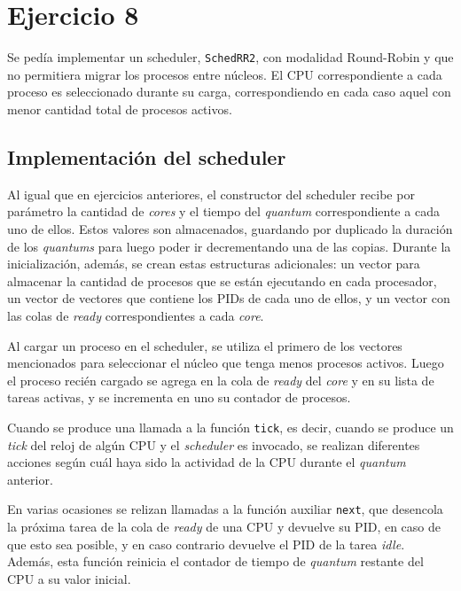 \section{Ejercicio 8}

Se pedía implementar un scheduler, \texttt{SchedRR2}, con modalidad Round-Robin
y que no permitiera migrar los procesos entre núcleos. El CPU correspondiente a
cada proceso es seleccionado durante su carga, correspondiendo en cada caso
aquel con menor cantidad total de procesos activos.

\subsection{Implementación del scheduler}

Al igual que en ejercicios anteriores, el constructor del scheduler recibe por
parámetro la cantidad de \emph{cores} y el tiempo del \emph{quantum}
correspondiente a cada uno de ellos. Estos valores son almacenados, guardando
por duplicado la duración de los \emph{quantums} para luego poder ir
decrementando una de las copias. Durante la inicialización, además, se crean
estas estructuras adicionales: un vector para almacenar la cantidad de
procesos que se están ejecutando en cada procesador, un vector de vectores que
contiene los PIDs de cada uno de ellos, y un vector con las colas de
\emph{ready} correspondientes a cada \emph{core}.

Al cargar un proceso en el scheduler, se utiliza el primero de los vectores
mencionados para seleccionar el núcleo que tenga menos procesos activos. Luego
el proceso recién cargado se agrega en la cola de \emph{ready} del \emph{core}
y en su lista de tareas activas, y se incrementa en uno su contador de
procesos.

Cuando se produce una llamada a la función \texttt{tick}, es decir, cuando se
produce un \emph{tick} del reloj de algún CPU y el \emph{scheduler} es
invocado, se realizan diferentes acciones según cuál haya sido la actividad de
la CPU durante el \emph{quantum} anterior.

En varias ocasiones se relizan llamadas a la función auxiliar \texttt{next},
que desencola la próxima tarea de la cola de \emph{ready} de una CPU y
devuelve su PID, en caso de que esto sea posible, y en caso contrario devuelve
el PID de la tarea \emph{idle}. Además, esta función reinicia el contador de
tiempo de
\emph{quantum} restante del CPU a su valor inicial.

